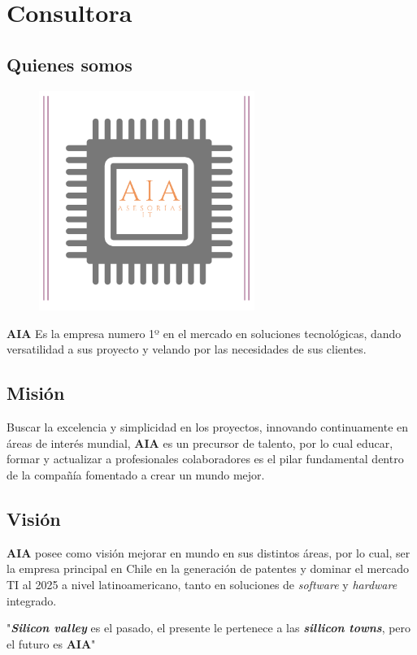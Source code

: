 \section{Consultora}
\subsection{Quienes somos}

\begin{figure}[h!]
\centering
\includegraphics[width=7cm]{Figuras/Logo-AIA.jpeg}
\end{figure}

\textbf{AIA} Es la empresa numero 1º en el mercado en soluciones tecnológicas,  dando versatilidad a sus proyecto y velando por las necesidades de sus clientes.

\subsection{Misión}
Buscar la excelencia y simplicidad en los proyectos,  innovando continuamente en áreas de interés mundial,   \textbf{AIA} es un precursor de talento,  por lo cual educar,  formar y actualizar a profesionales colaboradores es el pilar fundamental  dentro de la compañía fomentado a crear un mundo mejor.

\subsection{Visión}
\textbf{AIA} posee como visión mejorar en mundo en sus distintos áreas,  por lo cual,  ser la empresa principal en Chile en la generación de patentes y dominar el mercado TI al 2025 a nivel latinoamericano, tanto en soluciones de \textit{software} y \textit{hardware} integrado. 

"\textbf{\textit{Silicon valley}} es el pasado, el presente le pertenece a las \textbf{\textit{sillicon towns}},  pero el futuro es \textbf{AIA}"



